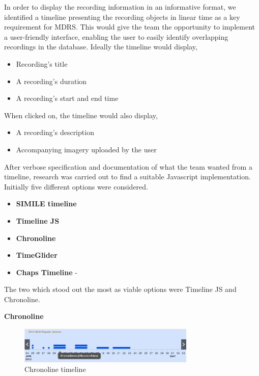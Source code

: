 \documentclass{l3proj}
\begin{document}

In order to display the recording information in an informative format, we identified a timeline presenting the recording objects in linear time as a key requirement for MDRS. This would give the team the opportunity to implement a user-friendly interface, enabling the user to easily identify overlapping recordings in the database. Ideally the timeline would display,

\begin{itemize}
\item{Recording's title}
\item{A recording's duration}
\item{A recording's start and end time}
\end{itemize}

When clicked on, the timeline would also display,
\begin{itemize}
\item{A recording's description}
\item{Accompanying imagery uploaded by the user}
\end{itemize}

After verbose specification and documentation of what the team wanted from a timeline, research was carried out to find a suitable Javascript implementation. Initially five different options were considered.

\begin{itemize}
\item{\textbf{SIMILE timeline} \cite{SIMILE}}
\item{\textbf{Timeline JS} \cite{TimelineJS}}
\item{\textbf{Chronoline} \cite{Chronoline}}
\item{\textbf{TimeGlider} \cite{TimegliderGithub}}
\item{\textbf{Chaps Timeline} - \cite{Chaps}}
\end{itemize}

The two which stood out the most as viable options were Timeline JS and Chronoline.

\textbf{Chronoline}
\begin{figure}[ht!]
  \centering
\includegraphics[width=0.75\textwidth]{images/Chronoline.png}
\caption{Chronoline timeline}
\end{figure}
\end{document}
